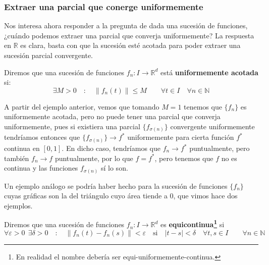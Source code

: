 \subsubsection{Extraer una parcial que conerge uniformemente}
\noindent
Nos interesa ahora responder a la pregunta de dada una sucesión de funciones, ¿cuándo podemos extraer una parcial que converja uniformemente? La respuesta en $\mathbb{R}$ es clara, basta con que la sucesión esté acotada para poder extraer una sucesión parcial convergente.

\begin{definicion}
    Diremos que una sucesión de funciones $f_n:I\to \mathbb{R}^d$ está \textbf{uniformemente acotada} si:
    \begin{equation*}
        \exists M>0 \quad :\quad  \|f_n(t)\|\leq M \qquad \forall t\in I\quad \forall n\in \mathbb{N}
    \end{equation*}
\end{definicion}

\begin{ejemplo}
    A partir del ejemplo anterior, vemos que tomando $M=1$ tenemos que $\{f_n\}$ es uniformemente acotada, pero no puede tener una parcial que converja uniformemente, pues si existiera una parcial $\{f_{\sigma(n)}\}$ convergente uniformemente tendríamos entonces que $\{f_{\sigma(n)}\}\to f^\ast$ uniformemente para cierta función $f^\ast$ continua en $[0,1]$. En dicho caso, tendríamos que $f_n\to f^\ast$ puntualmente, pero también $f_n\to f$ puntualmente, por lo que $f = f^\ast$, pero tenemos que $f$ no es continua y las funciones $f_{\sigma(n)}$ sí lo son.

    Un ejemplo análogo se podría haber hecho para la sucesión de funciones $\{f_n\}$ cuyas gráficas son la del triángulo cuyo área tiende a $0$, que vimos hace dos ejemplos.
\end{ejemplo}

\begin{definicion}
    Diremos que una sucesión de funciones $f_n:I\to \mathbb{R}^d$ es \textbf{equicontinua\footnote{En realidad el nombre debería ser equi-uniformemente-continua.}} si
    \begin{equation*}
        \forall \varepsilon>0~~\exists \delta>0\quad :\quad \|f_n(t)-f_n(s)\| < \varepsilon \quad \text{si} \quad |t-s|<\delta\quad \forall t,s\in I \qquad \forall n\in \mathbb{N}
    \end{equation*}
\end{definicion}

